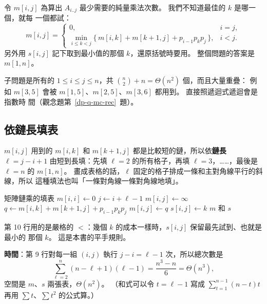 令 $m[i, j]$ 為算出 $A_{i..j}$ 最少需要的純量乘法次數。 我們不知道最佳的 $k$ 是哪一個，就每
一個都試：
\[
m[i, j] = \begin{cases}
0, & i = j, \\[2pt]
\displaystyle\min_{i \le k < j} \bigl\{\, m[i, k] + m[k+1, j] + p_{i-1} p_k p_j \,\bigr\}, & i < j .
\end{cases}
\]
另外用 $s[i, j]$ 記下取到最小值的那個 $k$，還原括號時要用。 整個問題的答案是 $m[1, n]$。

子問題是所有的 $1 \le i \le j \le n$，共 $\binom{n}{2} + n = \Theta(n^2)$ 個，而且大量重疊：
例如 $m[3, 5]$ 會被 $m[1, 5]$、$m[2, 5]$、$m[3, 6]$ 都用到。 直接照遞迴式遞迴會是指數時
間（觀念題第~\ref{dp-q-mc-rec}~題）。

\subsection{依鏈長填表}

$m[i, j]$ 用到的 $m[i, k]$ 和 $m[k+1, j]$ 都是比較短的鏈，所以依\textbf{鏈長}
$\ell = j - i + 1$ 由短到長填：先填 $\ell = 2$ 的所有格子，再填 $\ell = 3$，……，最後是
$\ell = n$ 的 $m[1, n]$。 畫成表格的話，$\ell$ 固定的格子排成一條和主對角線平行的斜線，所以
這種填法也叫「一條對角線一條對角線地填」。

\begin{pseudo}[label=alg:dp-mc-order]{矩陣鏈乘的填表}
        \State $m[i, i] \gets 0$
    \EndFor
     
            \State $j \gets i + \ell - 1$
            \State $m[i, j] \gets \infty$
                \State $q \gets m[i, k] + m[k + 1, j] + p_{i-1} p_k p_j$
                    \State $m[i, j] \gets q$
                    \State $s[i, j] \gets k$
                \EndIf
            \EndFor
        \EndFor
    \EndFor
    \State \Return $m$ 和 $s$
\EndFunction
\end{pseudo}

第 10 行用的是嚴格的 $<$：幾個 $k$ 的成本一樣時，$s[i, j]$ 保留最先試到、也就是最小的
那個 $k$。 這是本書的平手規則。

\textbf{時間}：第 9 行對每一組 $(i, j)$ 執行 $j - i = \ell - 1$ 次，所以總次數是
\[
\sum_{\ell=2}^{n} (n - \ell + 1)(\ell - 1) = \frac{n^3 - n}{6} = \Theta(n^3),
\]
空間是 $m$、$s$ 兩張表，$\Theta(n^2)$。 （和式可以令 $t = \ell - 1$ 寫成
$\sum_{t=1}^{n-1} (n - t)t$ 再用 $\sum t$、$\sum t^2$ 的公式算。）

